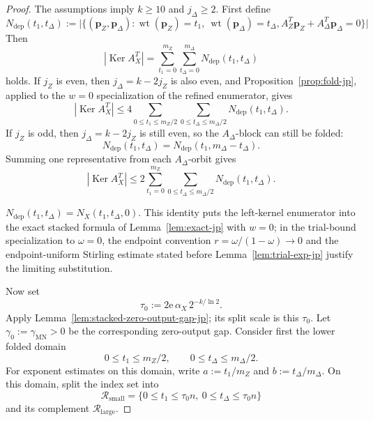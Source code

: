 \documentclass[11pt]{article}
\theoremstyle{definition}
\newcommand{\wt}{\operatorname{wt}}
\newcommand{\Ker}{\operatorname{Ker}}
\newcommand{\bp}{\mathbf p}
\newcommand{\NX}{N_X}
\begin{document}
\begin{proof}
The assumptions imply \(k\ge 10\) and \(j_\Delta\ge 2\).
First define
\begin{equation*}
N_{\mathrm{dep}}(t_1,t_\Delta)
:=
\bigl|
\{(\bp_Z,\bp_\Delta):
\wt(\bp_Z)=t_1,\ \wt(\bp_\Delta)=t_\Delta,
A_Z^T \bp_Z+A_\Delta^T \bp_\Delta=0
\}
\bigr|
\end{equation*}
Then
\begin{equation*}
|\Ker A_X^T|
=
\sum_{t_1=0}^{m_Z}\sum_{t_\Delta=0}^{m_\Delta}
N_{\mathrm{dep}}(t_1,t_\Delta)
\end{equation*}
holds.
If \(j_Z\) is even, then \(j_\Delta=k-2j_Z\) is also even, and
Proposition~\ref{prop:fold-jp}, applied to the \(w=0\) specialization of the
refined enumerator, gives
\begin{equation*}
|\Ker A_X^T|
\le
4\sum_{0\le t_1\le m_Z/2}\sum_{0\le t_\Delta\le m_\Delta/2}
N_{\mathrm{dep}}(t_1,t_\Delta).
\end{equation*}
If \(j_Z\) is odd, then \(j_\Delta=k-2j_Z\) is still even, so the \(A_\Delta\)-block can still be folded:
\[
N_{\mathrm{dep}}(t_1,t_\Delta)
=N_{\mathrm{dep}}(t_1,m_\Delta-t_\Delta).
\]
Summing one representative from each \(A_\Delta\)-orbit gives
\begin{equation}\label{eq:rank-partial-fold-jp}
|\Ker A_X^T|
\le
2\sum_{t_1=0}^{m_Z}\sum_{0\le t_\Delta\le m_\Delta/2}
N_{\mathrm{dep}}(t_1,t_\Delta).
\end{equation}

\(N_{\mathrm{dep}}(t_1,t_\Delta)=\NX(t_1,t_\Delta,0)\). This identity puts the left-kernel enumerator into the exact stacked formula of Lemma~\ref{lem:exact-jp} with \(w=0\); in the trial-bound specialization to \(\omega=0\), the endpoint convention \(r=\omega/(1-\omega)\to0\) and the endpoint-uniform Stirling estimate stated before Lemma~\ref{lem:trial-exp-jp} justify the limiting substitution.

Now set
\begin{equation*}
\tau_0:=2\mathrm{e}\,\alpha_X\,2^{-k/\ln 2}.
\end{equation*}
Apply Lemma~\ref{lem:stacked-zero-output-gap-jp}; its split scale is this \(\tau_0\). Let \(\gamma_0:=\gamma_{\mathrm{MN}}>0\) be the corresponding zero-output gap.
Consider first the lower folded domain
\[
0\le t_1\le m_Z/2,\qquad 0\le t_\Delta\le m_\Delta/2.
\]
For exponent estimates on this domain, write
\(a:=t_1/m_Z\) and \(b:=t_\Delta/m_\Delta\).
On this domain, split the index set into
\begin{equation*}
\mathcal R_{\mathrm{small}}
=
\{0\le t_1\le \tau_0 n,\ 0\le t_\Delta\le \tau_0 n\}
\end{equation*}
and its complement \(\mathcal R_{\mathrm{large}}\).


\end{proof}
\end{document}
